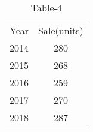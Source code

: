 \begin{table}[H]
    \centering
    \begin{tabular}{c|c}
      Year   & Sale(units) \\
      2014   & 280 \\
      2015   & 268 \\
      2016   & 259 \\
      2017   & 270\\
      2018   & 287\\
    \end{tabular}
    \caption{Table-4}
    \label{tab:tables/table4.tex}
\end{table}
